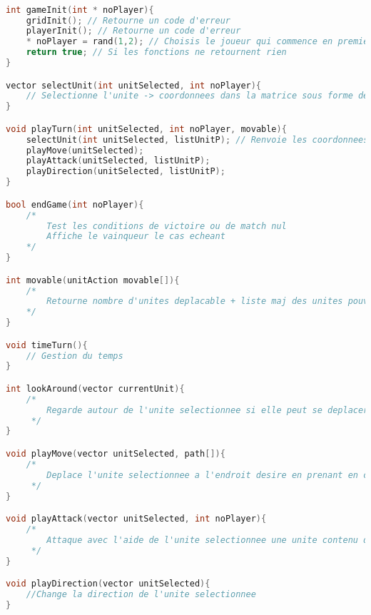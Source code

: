 \documentclass[a4paper,10pt]{extreport}
\begin{document}
\begin{lstlisting}[language=c]

int gameInit(int * noPlayer){
	gridInit(); // Retourne un code d'erreur
	playerInit(); // Retourne un code d'erreur
	* noPlayer = rand(1,2); // Choisis le joueur qui commence en premier
	return true; // Si les fonctions ne retournent rien
}

vector selectUnit(int unitSelected, int noPlayer){
	// Selectionne l'unite -> coordonnees dans la matrice sous forme de vecteur
}

void playTurn(int unitSelected, int noPlayer, movable){
	selectUnit(int unitSelected, listUnitP); // Renvoie les coordonnees de l'unite selectionnee
	playMove(unitSelected);
	playAttack(unitSelected, listUnitP);
	playDirection(unitSelected, listUnitP);
}

bool endGame(int noPlayer){
	/* 	
		Test les conditions de victoire ou de match nul
	 	Affiche le vainqueur le cas echeant
	*/
}

int movable(unitAction movable[]){
	/* 	
		Retourne nombre d'unites deplacable + liste maj des unites pouvant se deplacer
	*/
}

void timeTurn(){
	// Gestion du temps
}

int lookAround(vector currentUnit){
	/*
		Regarde autour de l'unite selectionnee si elle peut se deplacer sur une case si TP pas permise alors deplacement impossible
	 */
}

void playMove(vector unitSelected, path[]){
	/*
		Deplace l'unite selectionnee a l'endroit desire en prenant en compte les chemins possibles
	 */
}

void playAttack(vector unitSelected, int noPlayer){
	/*
		Attaque avec l'aide de l'unite selectionnee une unite contenu dans la liste listUnitP
	 */
}

void playDirection(vector unitSelected){
	//Change la direction de l'unite selectionnee
}

\end{lstlisting}
\end{document}
